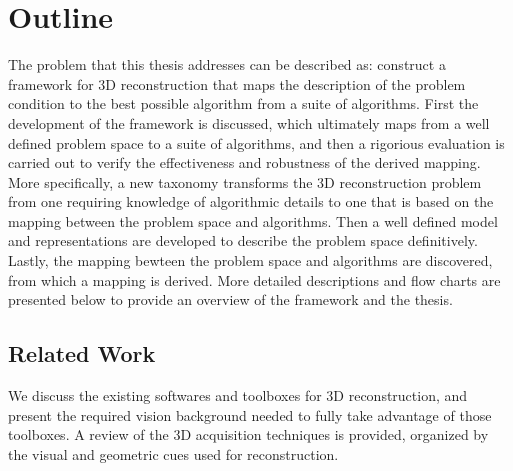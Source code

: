 
\section{Outline}
The problem that this thesis addresses can be described as: construct a framework for 3D reconstruction that maps the description of the problem condition to the best possible algorithm from a suite of algorithms. First the development of the framework is discussed, which ultimately maps from a well defined problem space to a suite of algorithms, and then a rigorious evaluation is carried out to verify the effectiveness and robustness of the derived mapping. More specifically, a new taxonomy transforms the 3D reconstruction problem from one requiring knowledge of algorithmic details to one that is based on the mapping between the problem space and algorithms. Then a well defined model and representations are developed to describe the problem space definitively. Lastly, the mapping bewteen the problem space and algorithms are discovered, from which a mapping is derived. More detailed descriptions and flow charts are presented below to provide an overview of the framework and the thesis.

\subsection{Related Work}
We discuss the existing softwares and toolboxes for 3D reconstruction, and present the required vision background needed to fully take advantage of those toolboxes. A review of the 3D acquisition techniques is provided, organized by the visual and geometric cues used for reconstruction.

